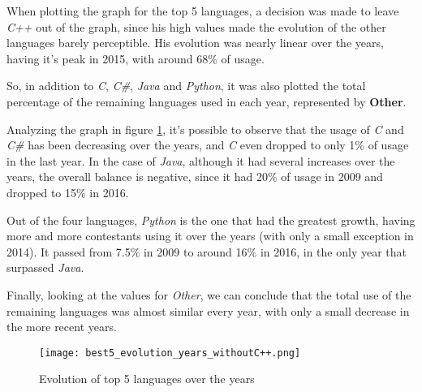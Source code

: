 \documentclass{article}
\begin{document}
\begin{multicols*}{2}
When plotting the graph for the top 5 languages, a decision was made to leave \textit{C++} out of the graph, since his high values made the evolution of the other languages barely perceptible. His evolution was nearly linear over the years, having it's peak in 2015, with around 68\% of usage.

So, in addition to \textit{C}, \textit{C\#}, \textit{Java} and \textit{Python}, it was also plotted the total percentage of the remaining languages used in each year, represented by \textbf{Other}.

Analyzing the graph in figure \ref{fig:top5_evo}, it's possible to observe that the usage of \textit{C} and \textit{C\#} has been decreasing over the years, and \textit{C} even dropped to only 1\% of usage in the last year.
In the case of \textit{Java}, although it had several increases over the years, the overall balance is negative, since it had 20\% of usage in 2009 and dropped to 15\% in 2016.

Out of the four languages, \textit{Python} is the one that had the greatest growth, having more and more contestants using it over the years (with only a small exception in 2014). It passed from 7.5\% in 2009 to around 16\% in 2016, in the only year that surpassed \textit{Java}.

Finally, looking at the values for \textit{Other}, we can conclude that the total use of the remaining languages was almost similar every year, with only a small decrease in the more recent years.

\begin{figure}[H]
    \centering
    \texttt{[image: best5\_evolution\_years\_withoutC++.png]}
    \caption{Evolution of top 5 languages over the years}
    \label{fig:top5_evo}
\end{figure}





\end{multicols*}
\end{document}
